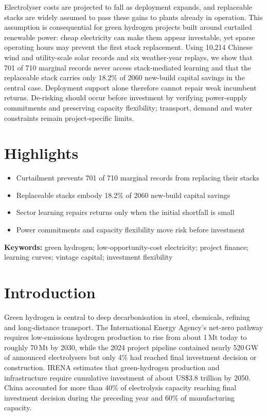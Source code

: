 \documentclass[11pt,a4paper]{article}
\begin{document}
Electrolyser costs are projected to fall as deployment expands, and replaceable stacks are widely assumed to pass these gains to plants already in operation. This assumption is consequential for green hydrogen projects built around curtailed renewable power: cheap electricity can make them appear investable, yet sparse operating hours may prevent the first stack replacement. Using 10,214 Chinese wind and utility-scale solar records and six weather-year replays, we show that 701 of 710 marginal records never access stack-mediated learning and that the replaceable stack carries only 18.2\% of 2060 new-build capital savings in the central case. Deployment support alone therefore cannot repair weak incumbent returns. De-risking should occur before investment by verifying power-supply commitments and preserving capacity flexibility; transport, demand and water constraints remain project-specific limits.

\section*{Highlights}

\begin{itemize}
\setlength{\itemsep}{0pt}
\setlength{\parsep}{0pt}
\setlength{\topsep}{2pt}
\item Curtailment prevents 701 of 710 marginal records from replacing their stacks
\item Replaceable stacks embody 18.2\% of 2060 new-build capital savings
\item Sector learning repairs returns only when the initial shortfall is small
\item Power commitments and capacity flexibility move risk before investment
\end{itemize}

\noindent\textbf{Keywords:} green hydrogen; low-opportunity-cost electricity; project finance; learning curves; vintage capital; investment flexibility
\vspace{1em}

\section*{Introduction}

Green hydrogen is central to deep decarbonisation in steel, chemicals, refining and long-distance transport\cite{staffell2019,yang2022,ueckerdt2021}. The International Energy Agency's net-zero pathway requires low-emissions hydrogen production to rise from about 1\,Mt today to roughly 70\,Mt by 2030, while the 2024 project pipeline contained nearly 520\,GW of announced electrolysers but only 4\% had reached final investment decision or construction\cite{iea2023nze,iea2024}. IRENA estimates that green-hydrogen production and infrastructure require cumulative investment of about US\$3.8 trillion by 2050\cite{irena2023}. China accounted for more than 40\% of electrolysis capacity reaching final investment decision during the preceding year and 60\% of manufacturing capacity\cite{nea2024capacity,pan2021,guo2023coal,ndrc2022}.
\end{document}
